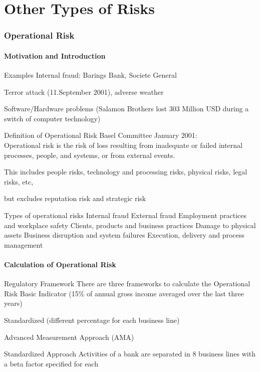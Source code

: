 \part{Other Types of Risks}
\section{Operational Risk}
\subsection{Motivation and Introduction }

Examples
	Internal fraud: Barings Bank, Societe General
	
	Terror attack (11.September 2001), adverse weather
	
	Software/Hardware problems (Salamon Brothers lost 303 Million USD during a switch of computer technology)


Definition of Operational Risk
	Basel Committee January 2001:\\
	Operational risk is the risk of loss resulting from inadequate or failed internal processes, people, and systems, or from external events.
	
	This includes people risks, technology and processing risks, physical risks, legal risks, etc,
	
	but excludes reputation risk and strategic risk


Types of operational risks
	Internal fraud
	External fraud
	Employment practices and workplace safety
	Clients, products and business practices
	Damage to physical assets
	Business disruption and system failures
	Execution, delivery and process management


\subsection{Calculation of Operational Risk}

Regulatory Framework
	There are three frameworks to calculate the Operational Risk
		Basic Indicator (15\% of annual gross income averaged over the last three years)
		
		Standardized (different percentage for each business line)
		
		Advanced Measurement Approach (AMA)


Standardized Approach
	Activities of a bank are separated in 8 business lines with a beta factor specified for each
	
